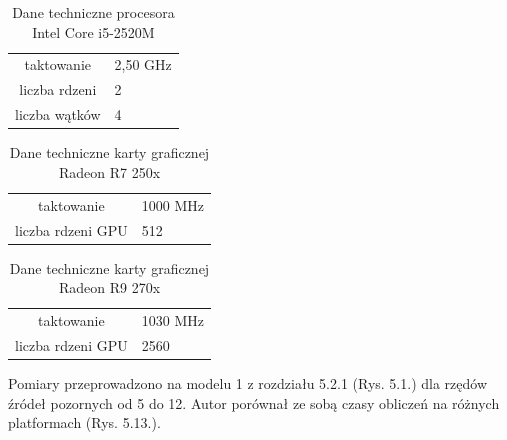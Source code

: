 \begin{table}[h]
        \centering
        \begin{threeparttable}
                \caption{Dane techniczne procesora Intel Core i5-2520M}\label{tab:table_example}
                \begin{tabularx}{0.6\textwidth}{| c | X |}
                       \midrule
		taktowanie & 2,50 GHz \\
                     liczba rdzeni & 2 \\
                    liczba wątków & 4 \\
                        \bottomrule
                \end{tabularx}
        \end{threeparttable}
\end{table}

\begin{table}[h]
        \centering
        \begin{threeparttable}
                \caption{Dane techniczne karty graficznej Radeon R7 250x}\label{tab:table_example}
                \begin{tabularx}{0.6\textwidth}{| c | X |}
                       \midrule
		taktowanie & 1000 MHz \\
                     liczba rdzeni GPU & 512 \\
                        \bottomrule
                \end{tabularx}
        \end{threeparttable}
\end{table}

\begin{table}[h]
        \centering
        \begin{threeparttable}
                \caption{Dane techniczne karty graficznej Radeon R9 270x}\label{tab:table_example}
                \begin{tabularx}{0.6\textwidth}{| c | X |}
                       \midrule
		taktowanie & 1030 MHz \\
                     liczba rdzeni GPU & 2560 \\
                        \bottomrule
                \end{tabularx}
        \end{threeparttable}
\end{table}

Pomiary przeprowadzono na modelu 1 z rozdziału 5.2.1 (Rys. 5.1.) dla rzędów źródeł pozornych od 5 do 12. Autor porównał ze sobą czasy obliczeń na różnych platformach (Rys. 5.13.).

